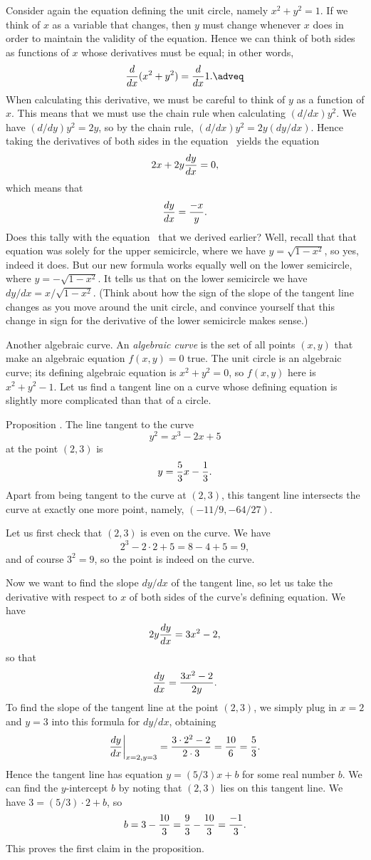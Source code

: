 Consider again the equation defining the unit circle, namely $x^2+y^2 = 1$. If we think of $x$ as a variable
that changes, then $y$ must change whenever $x$ does in order to maintain the validity of the equation.
Hence we can think of both sides as functions of $x$ whose derivatives must be equal; in other words,
\edef\equnitcircle{\the\eqcount}
$${d\over dx} (x^2 + y^2) = {d\over dx} 1.\adveq$$
When calculating this derivative, we must be careful to think of $y$ as a function of $x$. This means
that we must use the chain rule when calculating $(d/dx) y^2$. We have $(d/dy) y^2 = 2y$, so by the chain
rule, $(d/dx) y^2 = 2y(dy/dx)$. Hence taking the derivatives of both sides
in the equation~\refeq{\equnitcircle} yields the equation
$$2x + 2y{dy\over dx} = 0,$$
which means that
$${dy\over dx} = {-x\over y}.$$
Does this tally with the equation~ that we derived earlier? Well, recall that
that equation was solely for the upper semicircle, where we have $y=\sqrt{1-x^2}$, so yes, indeed it does.
But our new formula works equally well on the lower semicircle, where $y=-\sqrt{1-x^2}$. It tells us that
on the lower semicircle we have $dy/dx = x/\sqrt{1-x^2}$. (Think about how the sign of the slope of the
tangent line changes as you move around the unit circle, and convince yourself that this change in sign
for the derivative of the lower semicircle makes sense.)

\medskip\boldlabel {} Another algebraic curve.
An {\it algebraic curve} is the set of all points $(x,y)$ that
make an algebraic equation $f(x,y) = 0$ true. The unit circle is an algebraic curve; its defining algebraic
equation is $x^2 + y^2 = 0$, so $f(x,y)$ here is $x^2 + y^2 - 1$.
Let us find a tangent line on a curve
whose defining equation is slightly more complicated than that of a circle.

\edef\propelliptic{\the\thmcount}
\proclaim Proposition \advthm. The line tangent to the curve
$$y^2 = x^3 -2x + 5$$
at the point $(2,3)$ is
$$y = {5\over 3} x - {1\over 3}.$$
Apart from being tangent to the curve at $(2,3)$, this tangent line intersects the curve at exactly
one more point, namely, $(-11/9,-64/27)$.

\proof Let us first check that $(2,3)$ is even on the curve. We have
$$2^3-2\cdot 2 + 5 = 8-4+5 = 9,$$
and of course $3^2 =9$, so the point is indeed on the curve.

Now we want to find the slope $dy/dx$ of the tangent line, so let us take the derivative with respect
to $x$ of both sides of the curve's defining equation. We have
$$2y{dy\over dx} = 3x^2 - 2,$$
so that
$${dy\over dx} = {3x^2 - 2\over 2y}.$$
To find the slope of the tangent line at the point $(2,3)$, we simply plug in $x=2$ and $y=3$ into this
formula for $dy/dx$, obtaining
$${dy\over dx}\bigg|_{x=2, y=3} = {3\cdot 2^2 - 2\over 2\cdot 3} = {10\over 6} = {5\over 3}.$$
Hence the tangent line has equation $y=(5/3)x + b$ for some real number $b$. We can find the $y$-intercept
$b$ by noting that $(2,3)$ lies on this tangent line. We have $3 = (5/3)\cdot 2 + b$, so
$$b=3-{10\over 3} = {9\over 3} - {10\over 3} = {-1\over 3}.$$
This proves the first claim in the proposition.

